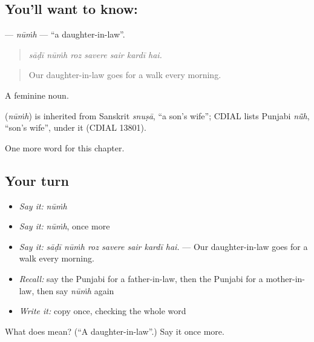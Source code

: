 \subsection*{You'll want to know: }
\textbf{} — \emph{nūṁh} — \textquotedblleft{}a daughter-in-law\textquotedblright{}.

\begin{quote}
      
\end{quote}

\begin{quote}
\emph{sāḍī nūṁh roz savere sair kardī hai.}
\end{quote}

\begin{quote}
Our daughter-in-law goes for a walk every morning.
\end{quote}

A feminine noun.

\begin{cousinweb}
\textbf{} (\emph{nūṁh}) is inherited from Sanskrit \emph{snuṣā}, \textquotedblleft{}a son's wife\textquotedblright{}; CDIAL lists Punjabi \emph{nū̃h}, \textquotedblleft{}son's wife\textquotedblright{}, under it (CDIAL 13801).
\end{cousinweb}

\begin{grammarlens}[title={What you've built}]
One more word for this chapter.
\end{grammarlens}

\subsection*{Your turn}
\begin{itemize}
\raggedright
  \item \emph{Say it:} \emph{nūṁh}
  \item \emph{Say it:} \emph{nūṁh}, once more
  \item \emph{Say it:} \emph{sāḍī nūṁh roz savere sair kardī hai.} — Our daughter-in-law goes for a walk every morning.
  \item \emph{Recall:} say the Punjabi for a father-in-law, then the Punjabi for a mother-in-law, then say \emph{nūṁh} again
  \item \emph{Write it:} copy \textbf{} once, checking the whole word
\end{itemize}

\begin{tcolorbox}[breakable,colback=teal!4,colframe=teal!35!black,title={Before you move on}]
What does  mean? (\textquotedblleft{}A daughter-in-law\textquotedblright{}.) Say it once more.
\end{tcolorbox}
